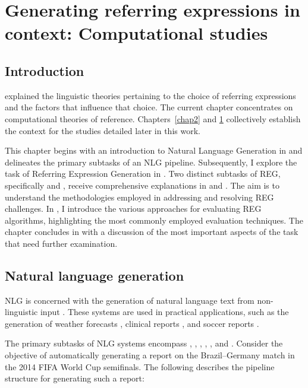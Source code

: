 \chapter{Generating referring expressions in context: Computational studies}\label{chap3}


\section{Introduction}\label{sec:introduction}

 explained the linguistic theories pertaining to the choice of referring expressions and the factors that influence that choice. The current chapter concentrates on computational theories of reference.
Chapters~\ref{chap2} and \ref{chap3} collectively establish the context for the studies detailed later in this work.

This chapter begins with an introduction to Natural Language Generation in  and delineates the primary subtasks of an NLG pipeline. Subsequently, I explore the task of Referring Expression Generation in . Two distinct subtasks of REG, specifically \shot and \context, receive comprehensive explanations in  and . The aim is to understand the methodologies employed in addressing and resolving REG challenges. In  , I introduce the various approaches for evaluating REG algorithms, highlighting the most commonly employed evaluation techniques. The chapter concludes in  with a discussion of the most important aspects of the \context task that need further examination.

 
\section{Natural language generation}\label{sec:nlg}
NLG is concerned with the generation of natural language text from non-lin\-guis\-tic input \citep{gatt2018survey}. These systems are used in practical applications, such as the generation of weather forecasts \citep{mei-etal-2016-talk}, clinical reports \citep{portet2009,gatt2009data}, and soccer reports \citep{van-der-lee-etal-2017-pass}.

The primary subtasks of NLG systems encompass , , , , , and  \citep{reiter2000building}. Consider the objective of automatically generating a report on the Brazil--Germany match in the 2014 FIFA World Cup semifinals. The following describes the pipeline structure for generating such a report:

